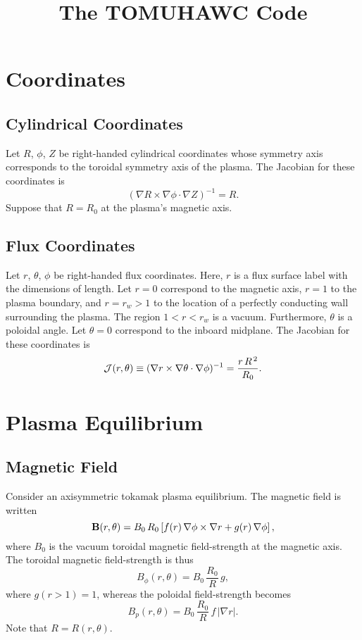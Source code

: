 \documentclass[12pt,prb,aps,notitlepage]{revtex4-1}
\begin{document}
\title{The {\sc TOMUHAWC} Code}
\maketitle

\section{Coordinates}
\subsection{Cylindrical Coordinates}
Let $R$, $\phi$, $Z$ be right-handed cylindrical coordinates whose symmetry axis corresponds to the toroidal symmetry
axis of the plasma. The Jacobian for these coordinates is 
\begin{equation}\label{e1}
(\nabla R\times \nabla\phi\cdot\nabla Z)^{-1} = R.
\end{equation}
Suppose that $R=R_0$ at the plasma's magnetic axis. 

\subsection{Flux Coordinates}
Let $r$, $\theta$, $\phi$ be right-handed flux coordinates. Here, $r$ is a  flux surface label with the dimensions of length.  Let $r=0$ correspond to
the magnetic axis, $r=1$ to the plasma boundary, and $r=r_w>1$  to the location of a perfectly conducting wall surrounding the plasma. The
region $1<r<r_w$ is a vacuum. Furthermore, $\theta$ is a poloidal angle. Let $\theta=0$ correspond to
the inboard midplane. The Jacobian for these coordinates is 
\begin{equation}\label{e2}
{\cal J}(r,\theta) \equiv (\nabla r\times \nabla\theta\cdot\nabla\phi)^{-1}= \frac{r\,R^{\,2}}{R_0}.
\end{equation}

\section{Plasma Equilibrium}
\subsection{Magnetic Field}
Consider an axisymmetric tokamak plasma equilibrium. 
The magnetic field is written
\begin{equation}
{\bf B}(r,\theta) = B_0\,R_0\left[f(r)\,\nabla\phi\times\nabla r + g(r)\,\nabla\phi\right],
\end{equation}
where $B_0$ is the vacuum toroidal magnetic field-strength at the magnetic axis. 
The toroidal magnetic field-strength is thus
\begin{equation}
B_\phi(r,\theta)= B_0\,\frac{R_0}{R}\,g,
\end{equation}
where $g(r>1)=1$, whereas the 
poloidal field-strength becomes
\begin{equation}\label{e5}
B_p(r,\theta) = B_0\,\frac{R_0}{R}\,f\,|\nabla r|.
\end{equation}
Note that $R=R(r,\theta)$. 
\end{document}
